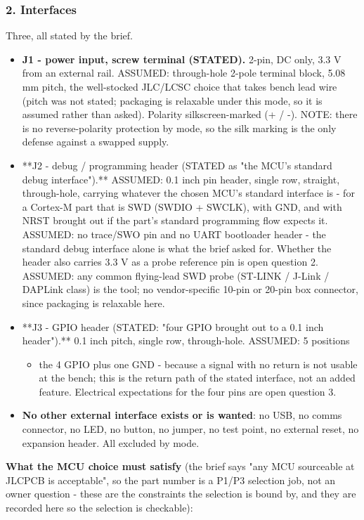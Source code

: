 \documentclass[11pt,a4paper]{article}
\begin{document}
\subsubsection*{2. Interfaces}
Three, all stated by the brief.

\begin{itemize}
\item \textbf{J1 - power input, screw terminal (STATED).} 2-pin, DC only, 3.3 V from
an external rail. ASSUMED: through-hole 2-pole terminal block, 5.08 mm
pitch, the well-stocked JLC/LCSC choice that takes bench lead wire (pitch
was not stated; packaging is relaxable under this mode, so it is assumed
rather than asked). Polarity silkscreen-marked (+ / -). NOTE: there is no
reverse-polarity protection by mode, so the silk marking is the only
defense against a swapped supply.
\item {*}{*}J2 - debug / programming header (STATED as "the MCU's standard debug
interface").{*}{*} ASSUMED: 0.1 inch pin header, single row, straight,
through-hole, carrying whatever the chosen MCU's standard interface is -
for a Cortex-M part that is SWD (SWDIO + SWCLK), with GND, and with NRST
brought out if the part's standard programming flow expects it. ASSUMED: no
trace/SWO pin and no UART bootloader header - the standard debug interface
alone is what the brief asked for. Whether the header also carries 3.3 V as
a probe reference pin is open question 2. ASSUMED: any common flying-lead
SWD probe (ST-LINK / J-Link / DAPLink class) is the tool; no vendor-specific
10-pin or 20-pin box connector, since packaging is relaxable here.
\item {*}{*}J3 - GPIO header (STATED: "four GPIO brought out to a 0.1 inch
header").{*}{*} 0.1 inch pitch, single row, through-hole. ASSUMED: 5 positions
\begin{itemize}
\item the 4 GPIO plus one GND - because a signal with no return is not usable
at the bench; this is the return path of the stated interface, not an added
feature. Electrical expectations for the four pins are open question 3.
\end{itemize}
\item \textbf{No other external interface exists or is wanted}: no USB, no comms
connector, no LED, no button, no jumper, no test point, no external
reset, no expansion header. All excluded by mode.
\end{itemize}
\textbf{What the MCU choice must satisfy} (the brief says "any MCU sourceable at JLCPCB is acceptable", so the part number is a P1/P3 selection job, not an owner question - these are the constraints the selection is bound by, and they are recorded here so the selection is checkable):
\end{document}
